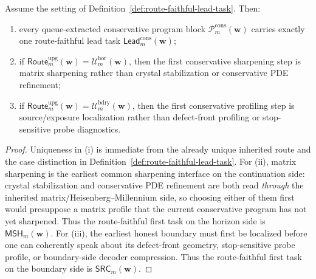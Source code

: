 \begin{proposition}
\label{prop:every-conservative-program-block-carries-exactly-one-normalized-first-task}
Assume the setting of Definition~\ref{def:route-faithful-lead-task}. Then:
\begin{enumerate}[label=(\roman*)]
  \item every queue-extracted conservative program block \(\mathcal P^{\mathrm{cons}}_{m}(\mathbf w)\) carries exactly one route-faithful lead task \(\mathsf{Lead}^{\mathrm{cons}}_{m}(\mathbf w)\);
  \item if \(\mathsf{Route}^{\mathrm{upg}}_{m}(\mathbf w)=\mathcal U^{\mathrm{hor}}_{m}(\mathbf w)\), then the first conservative sharpening step is matrix sharpening rather than crystal stabilization or conservative PDE refinement;
  \item if \(\mathsf{Route}^{\mathrm{upg}}_{m}(\mathbf w)=\mathcal U^{\mathrm{bdry}}_{m}(\mathbf w)\), then the first conservative profiling step is source/exposure localization rather than defect-front profiling or stop-sensitive probe diagnostics.
\end{enumerate}
\end{proposition}

\begin{proof}
Uniqueness in (i) is immediate from the already unique inherited route and the case distinction in Definition~\ref{def:route-faithful-lead-task}. For (ii), matrix sharpening is the earliest common sharpening interface on the continuation side: crystal stabilization and conservative PDE refinement are both read \emph{through} the inherited matrix/Heisenberg--Millennium side, so choosing either of them first would presuppose a matrix profile that the current conservative program has not yet sharpened. Thus the route-faithful first task on the horizon side is \(\mathsf{MSH}_{m}(\mathbf w)\). For (iii), the earliest honest boundary must first be localized before one can coherently speak about its defect-front geometry, stop-sensitive probe profile, or boundary-side decoder compression. Thus the route-faithful first task on the boundary side is \(\mathsf{SRC}_{m}(\mathbf w)\).
\end{proof}

